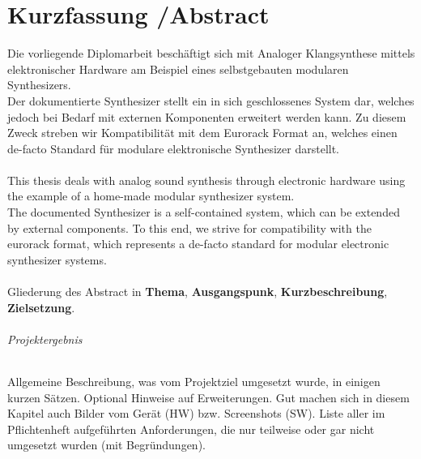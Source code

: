 \chapter*{Kurzfassung /Abstract }
\label{cha:abstract}

Die vorliegende Diplomarbeit beschäftigt sich mit Analoger Klangsynthese mittels elektronischer Hardware am Beispiel eines selbstgebauten modularen Synthesizers. \\

Der dokumentierte Synthesizer stellt ein in sich geschlossenes System dar, welches jedoch bei Bedarf mit externen Komponenten erweitert werden kann. Zu diesem Zweck streben wir Kompatibilität mit dem Eurorack Format an, welches einen de-facto Standard für modulare elektronische Synthesizer darstellt. \\ \\


This thesis deals with analog sound synthesis through electronic hardware using the example of a home-made modular synthesizer system. \\

The documented Synthesizer is a self-contained system, which can be extended by external components. To this end, we strive for compatibility with the eurorack format, which represents a de-facto standard for modular electronic synthesizer systems. \\ \\

Gliederung des Abstract in \textbf{Thema}, \textbf{Ausgangspunk}, \textbf{Kurzbeschreibung}, \textbf{Zielsetzung}.  

\subparagraph{Projektergebnis}

Allgemeine Beschreibung, was vom Projektziel umgesetzt wurde, in einigen kurzen Sätzen. Optional Hinweise auf Erweiterungen. Gut machen sich in diesem Kapitel auch Bilder vom Gerät (HW) bzw. Screenshots (SW).
Liste aller im Pflichtenheft aufgeführten Anforderungen, die nur teilweise oder gar nicht umgesetzt wurden (mit Begründungen).
